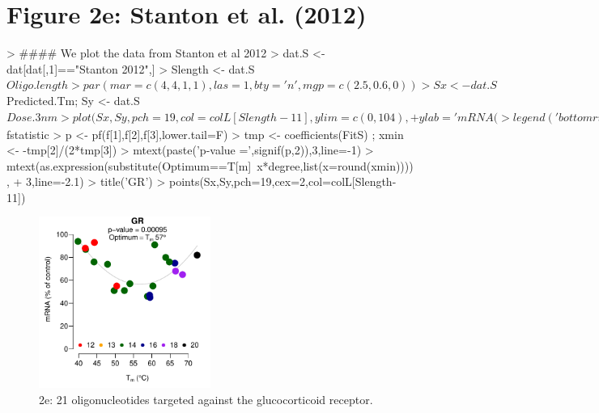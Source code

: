\documentclass{article}
\newenvironment{Ncenter}{%
  \setlength\topsep{-10pt}
  \setlength\parskip{-100pt}
  \begin{center}
}{%
  \end{center}
}
\begin{document}
\section*{Figure 2e: Stanton et al. (2012)}
\begin{Schunk}
\begin{Sinput}
> #### We plot the data from Stanton et al 2012
> dat.S <- dat[dat[,1]=="Stanton 2012",]
> Slength <- dat.S$Oligo.length
> par(mar=c(4,4,1,1),las=1,bty='n',mgp=c(2.5,0.6,0))
> Sx <- dat.S$Predicted.Tm; Sy <- dat.S$Dose.3nm
> plot(Sx,Sy, pch=19,col=colL[Slength-11],ylim=c(0,104),
+      ylab='mRNA (%
> legend('bottomright',as.character(sort(unique(OLength))),
+        pch=19,col=colL[sort(unique(OLength))-11],bg='white',horiz=T,bty='n')
> FitS <- lm(Sy ~ Sx + I(Sx^2))
> Parfun <- function(D1){
+   tmp <- coefficients(FitS) 
+   tmp[1]+tmp[2]*D1+tmp[3]*D1^2}
> curve(Parfun(x),min(Sx),max(Sx), lwd=1,add=T,col='grey')
> f <- summary(FitS)$fstatistic
> p <- pf(f[1],f[2],f[3],lower.tail=F)
> tmp <- coefficients(FitS) ; xmin <- -tmp[2]/(2*tmp[3])
> mtext(paste('p-value =',signif(p,2)),3,line=-1)
> mtext(as.expression(substitute(Optimum==T[m]~x*degree,list(x=round(xmin)))),
+       3,line=-2.1)
> title('GR')
> points(Sx,Sy,pch=19,cex=2,col=colL[Slength-11])
\end{Sinput}
\end{Schunk}
\begin{figure}[!h]
\begin{Ncenter}
\includegraphics[width=0.5\textwidth]{Vignette2-Fig5}
\end{Ncenter}
\caption{2e: 21 oligonucleotides targeted against the glucocorticoid receptor.}
\end{figure}
\end{document}
